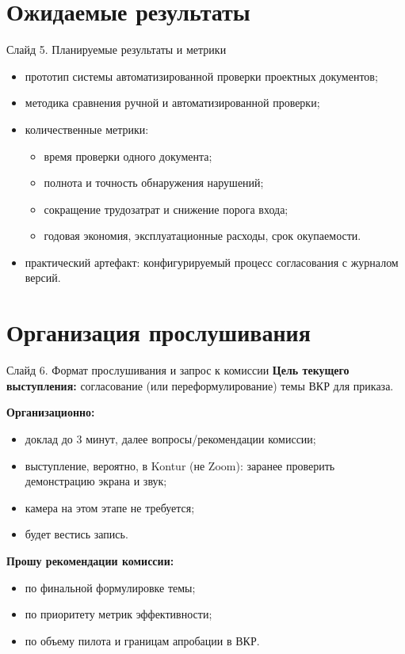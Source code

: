 \documentclass[aspectratio=169,12pt]{beamer}
\begin{document}
\section{Ожидаемые результаты}
\begin{frame}{Слайд 5. Планируемые результаты и метрики}
\begin{itemize}
  \item прототип системы автоматизированной проверки проектных документов;
  \item методика сравнения ручной и автоматизированной проверки;
  \item количественные метрики:
  \begin{itemize}
    \item время проверки одного документа;
    \item полнота и точность обнаружения нарушений;
    \item сокращение трудозатрат и снижение порога входа;
    \item годовая экономия, эксплуатационные расходы, срок окупаемости.
  \end{itemize}
  \item практический артефакт: конфигурируемый процесс согласования с журналом версий.
\end{itemize}
\end{frame}

\section{Организация прослушивания}
\begin{frame}{Слайд 6. Формат прослушивания и запрос к комиссии}
\textbf{Цель текущего выступления:} согласование (или переформулирование) темы ВКР для приказа.

\vspace{0.6em}
\textbf{Организационно:}
\begin{itemize}
  \item доклад до 3 минут, далее вопросы/рекомендации комиссии;
  \item выступление, вероятно, в Kontur (не Zoom): заранее проверить демонстрацию экрана и звук;
  \item камера на этом этапе не требуется;
  \item будет вестись запись.
\end{itemize}

\vspace{0.6em}
\textbf{Прошу рекомендации комиссии:}
\begin{itemize}
  \item по финальной формулировке темы;
  \item по приоритету метрик эффективности;
  \item по объему пилота и границам апробации в ВКР.
\end{itemize}
\end{frame}
\end{document}
